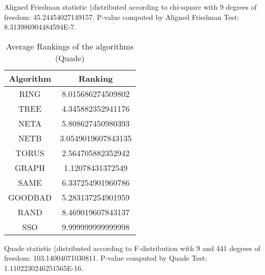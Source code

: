 \documentclass[a4paper,10pt]{article}
\begin{document}
\begin{landscape}
Aligned Friedman statistic (distributed according to chi-square with 9 degrees of freedom: 45.24454027149157. 
P-value computed by Aligned Friedman Test: 8.313986904484594E-7.\newline


\newpage

\begin{table}[!htp]
\centering
\caption{Average Rankings of the algorithms (Quade)
}\begin{tabular}{c|c}
Algorithm&Ranking\\
\hline
 RING&8.015686274509802\\
 TREE&4.345882352941176\\
 NETA&5.808627450980393\\
 NETB&3.0549019607843135\\
 TORUS&2.564705882352942\\
 GRAPH&1.12078431372549\\
 SAME&6.337254901960786\\
 GOODBAD&5.283137254901959\\
 RAND&8.469019607843137\\
 SSO&9.999999999999998\\
\end{tabular}
\end{table}
Quade statistic (distributed according to F-distribution with 9 and 441 degrees of freedom: 103.14004071030811. 
P-value computed by Quade Test: 1.1102230246251565E-16.\newline


\newpage


\end{landscape}
\end{document}
